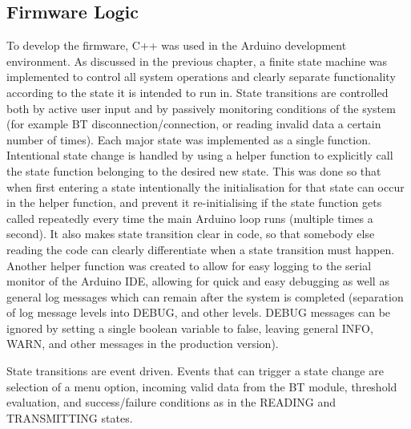 \subsection{Firmware Logic}
To develop the firmware, C++ was used in the Arduino development environment. As discussed in the previous chapter, a finite state machine was implemented to control all system operations and clearly separate functionality according to the state it is intended to run in. State transitions are controlled both by active user input and by passively monitoring conditions of the system (for example BT disconnection/connection, or reading invalid data a certain number of times). Each major state was implemented as a single function. Intentional state change is handled by using a helper function to explicitly call the state function belonging to the desired new state. This was done so that when first entering a state intentionally the initialisation for that state can occur in the helper function, and prevent it re-initialising if the state function gets called repeatedly every time the main Arduino loop runs (multiple times a second). It also makes state transition clear in code, so that somebody else reading the code can clearly differentiate when a state transition must happen. Another helper function was created to allow for easy logging to the serial monitor of the Arduino IDE, allowing for quick and easy debugging as well as general log messages which can remain after the system is completed (separation of log message levels into DEBUG, and other levels. DEBUG messages can be ignored by setting a single boolean variable to false, leaving general INFO, WARN, and other messages in the production version).

State transitions are event driven. Events that can trigger a state change are selection of a menu option, incoming valid data from the BT module, threshold evaluation, and success/failure conditions as in the READING and TRANSMITTING states.

